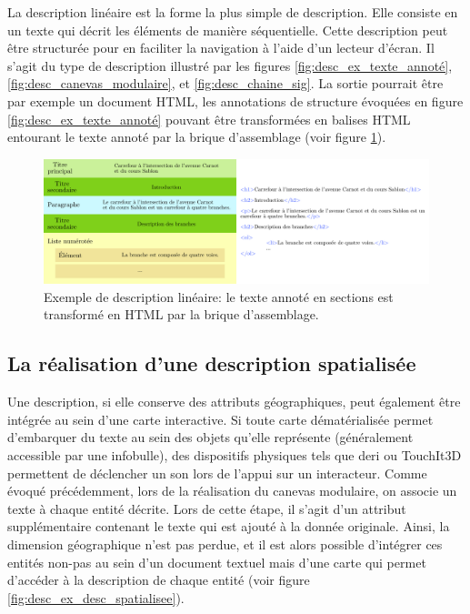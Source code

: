 \label{sec:description_textuelle}

La description linéaire est la forme la plus simple de description. Elle consiste en un texte qui décrit les éléments de manière séquentielle. Cette description peut être structurée pour en faciliter la navigation à l'aide d'un lecteur d'écran. Il s'agit du type de description illustré par les figures \ref{fig:desc_ex_texte_annoté}, \ref{fig:desc_canevas_modulaire}, et \ref{fig:desc_chaine_sig}. La sortie pourrait être par exemple un document HTML, les annotations de structure évoquées en figure \ref{fig:desc_ex_texte_annoté} pouvant être transformées en balises HTML entourant le texte annoté par la brique d'assemblage (voir figure \ref{fig:desc_ex_desc_lineaire}).

\begin{figure}[ht]
    \centering
    \includegraphics[width=\textwidth]{images/description/exemple_desc_lineaire.pdf
    }
    \caption[Exemple de description linéaire.]{Exemple de description linéaire: le texte annoté en sections est transformé en HTML par la brique d'assemblage.}
    \label{fig:desc_ex_desc_lineaire}
\end{figure}

\subsection{La réalisation d'une description spatialisée}

\label{sec:description_carte}

Une description, si elle conserve des attributs géographiques, peut également être intégrée au sein d'une carte interactive. Si toute carte dématérialisée permet d'embarquer du texte au sein des objets qu'elle représente (généralement accessible par une infobulle), des dispositifs physiques tels que \gls{deri} \citep{Brock2012} ou TouchIt3D \citep{barvir2021} permettent de déclencher un son lors de l'appui sur un interacteur. Comme évoqué précédemment, lors de la réalisation du canevas modulaire, on associe un texte à chaque entité décrite. Lors de cette étape, il s'agit d'un attribut supplémentaire contenant le texte qui est ajouté à la donnée originale. Ainsi, la dimension géographique n'est pas perdue, et il est alors possible d'intégrer ces entités non-pas au sein d'un document textuel mais d'une carte qui permet d'accéder à la description de chaque entité (voir figure \ref{fig:desc_ex_desc_spatialisee}).

